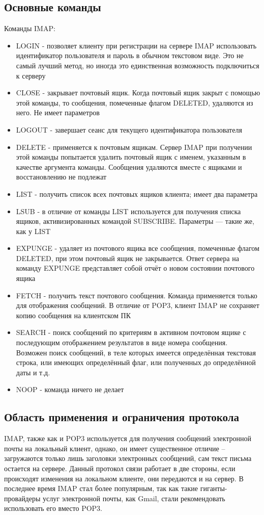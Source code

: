 \subsection{Основные команды}
Команды IMAP:
\begin{itemize}
\item LOGIN - позволяет клиенту при регистрации на сервере IMAP использовать идентификатор пользователя и пароль в обычном текстовом виде. Это не самый лучший метод, но иногда это единственная возможность подключиться к серверу
\item CLOSE - закрывает почтовый ящик. Когда почтовый ящик закрыт с помощью этой команды, то сообщения, помеченные флагом DELETED, удаляются из него. Не имеет параметров
\item LOGOUT - завершает сеанс для текущего идентификатора пользователя
\item DELETE - применяется к почтовым ящикам. Сервер IMAP при получении этой команды попытается удалить почтовый ящик с именем, указанным в качестве аргумента команды. Сообщения удаляются вместе с ящиками и восстановлению не подлежат
\item LIST - получить список всех почтовых ящиков клиента; имеет два параметра
\item LSUB - в отличие от команды LIST используется для получения списка ящиков, активизированных командой SUBSCRIBE. Параметры — такие же, как у LIST
\item EXPUNGE - удаляет из почтового ящика все сообщения, помеченные флагом DELETED, при этом почтовый ящик не закрывается. Ответ сервера на команду EXPUNGE представляет собой отчёт о новом состоянии почтового ящика
\item FETCH - получить текст почтового сообщения. Команда применяется только для отображения сообщений. В отличие от POP3, клиент IMAP не сохраняет копию сообщения на клиентском ПК
\item SEARCH - поиск сообщений по критериям в активном почтовом ящике с последующим отображением результатов в виде номера сообщения. Возможен поиск сообщений, в теле которых имеется определённая текстовая строка, или имеющих определённый флаг, или полученных до определённой даты и т.д.
\item NOOP - команда ничего не делает
\end{itemize}

\subsection{Область применения и ограничения протокола}
IMAP, также как и POP3 используется для получения сообщений электронной почты на локальный клиент, однако, он имеет существенное отличие – загружаются только лишь заголовки электронных сообщений, сам текст письма остается на сервере. Данный протокол связи работает в две стороны, если происходят изменения на локальном клиенте, они передаются и на сервер. В последнее время IMAP стал более популярным, так как такие гиганты-провайдеры услуг электронной почты, как Gmail, стали рекомендовать использовать его вместо POP3.

